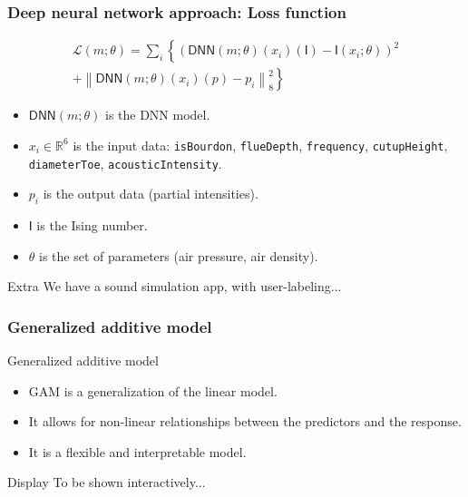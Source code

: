 \documentclass{beamer}
\begin{document}
    \begin{frame}
        \frametitle{Deep neural network approach: Loss function}
        \begin{multline*}
            \mathcal{L}(m; \theta) =
            \sum_i \left\{
            \left(
                \mathsf{DNN}(m; \theta)(x_i)(\mathsf{I}) 
                - \mathsf{I}(x_i; \theta)
            \right)^2 \right.
            \\
            +
            \left.
            \left\lVert
                \mathsf{DNN}(m; \theta)(x_i)(p) - p_i
            \right\rVert_8^2
            \right\}
        \end{multline*}
        \begin{itemize}
            \item \(\mathsf{DNN}(m; \theta)\) is the DNN model.
            \item \(x_i\in \mathbb{R}^6\) is the input data:
                \texttt{isBourdon}, \texttt{flueDepth}, \texttt{frequency},
                \texttt{cutupHeight}, \texttt{diameterToe}, \texttt{acousticIntensity}.
            \item \(p_i\) is the output data (partial intensities).
            \item \(\mathsf{I}\) is the Ising number.
            \item \(\theta\) is the set of parameters (air pressure, air density).
        \end{itemize}
        \begin{block}{Extra}
            We have a sound simulation app, with user-labeling...
        \end{block}
    \end{frame}

    \begin{frame}
        \frametitle{Generalized additive model}
        \begin{block}{Generalized additive model}
            \begin{itemize}
                \item GAM is a generalization of the linear model.
                \item It allows for non-linear relationships between the
                    predictors and the response.
                \item It is a flexible and interpretable model.
            \end{itemize}
        \end{block}
        \begin{block}{Display}
            To be shown interactively...
        \end{block}
    \end{frame}
\end{document}
